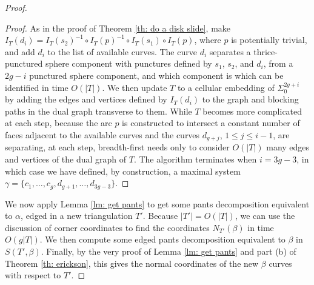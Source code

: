 \documentclass[10pt,a4paper]{amsart}
\begin{document}
\begin{proof}
\begin{proof}
    As in the proof of Theorem \ref{th: do a disk slide}, make $I_T(d_i)=I_T(s_2)^{-1}\circ I_T(p)^{-1}\circ I_T(s_1)\circ I_T(p)$, where $p$ is potentially trivial, and add $d_i$ to the list of available curves. 
    The curve $d_i$ separates a thrice-punctured sphere component with punctures defined by $s_1$, $s_2$, and $d_i$, from a $2g-i$ punctured sphere component, and which component is which can be identified in time $O(|T|)$.
    We then update $T$ to a cellular embedding of $\Sigma_0^{2g+i}$ by adding the edges and vertices defined by $I_T(d_i)$ to the graph and blocking paths in the dual graph transverse to them.
    While $T$ becomes more complicated at each step, because the arc $p$ is constructed to intersect a constant number of faces adjacent to the available curves and the curves $d_{g+j}$, $1\leq j\leq i-1$, are separating, at each step, breadth-first needs only to consider $O(|T|)$ many edges and vertices of the dual graph of $T$. 
    The algorithm terminates when $i=3g-3$, in which case we have defined, by construction, a maximal system $\gamma = \{c_1,\dots,c_g,d_{g+1},\dots,d_{3g-3}\}$.
\end{proof}

We now apply Lemma \ref{lm: get pants} to get some pants decomposition equivalent to $\alpha$, edged in a new triangulation $T'$. 
Because $|T'|=O(|T|)$, we can use the discussion of corner coordinates to find the coordinates $N_{T'}(\beta)$ in time $O(g|T|)$. 
We then compute some edged pants decomposition equivalent to $\beta$ in $S(T',\beta)$. 
Finally, by the very proof of Lemma \ref{lm: get pants} and part (b) of Theorem \ref{th: erickson}, this gives the normal coordinates of the new $\beta$ curves with respect to $T'$.
\end{proof}
\end{document}
